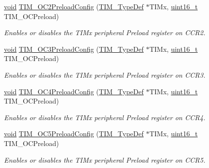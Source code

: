 \begin{DoxyCompactItemize}
\hyperlink{group___n_a_m_e_ga18028b8badbf1ea7e704ccac3c488e82}{void} \hyperlink{group___t_i_m___group2_ga75b4614c6dd2cd52f2c5becdb6590c10}{T\-I\-M\-\_\-\-O\-C2\-Preload\-Config} (\hyperlink{struct_t_i_m___type_def}{T\-I\-M\-\_\-\-Type\-Def} $\ast$T\-I\-Mx, \hyperlink{stdint_8h_a273cf69d639a59973b6019625df33e30}{uint16\-\_\-t} T\-I\-M\-\_\-\-O\-C\-Preload)
\begin{DoxyCompactList}\small\item\em Enables or disables the T\-I\-Mx peripheral Preload register on C\-C\-R2. \end{DoxyCompactList}\item 
\hyperlink{group___n_a_m_e_ga18028b8badbf1ea7e704ccac3c488e82}{void} \hyperlink{group___t_i_m___group2_ga8b2391685a519e60e596b7d596f86f09}{T\-I\-M\-\_\-\-O\-C3\-Preload\-Config} (\hyperlink{struct_t_i_m___type_def}{T\-I\-M\-\_\-\-Type\-Def} $\ast$T\-I\-Mx, \hyperlink{stdint_8h_a273cf69d639a59973b6019625df33e30}{uint16\-\_\-t} T\-I\-M\-\_\-\-O\-C\-Preload)
\begin{DoxyCompactList}\small\item\em Enables or disables the T\-I\-Mx peripheral Preload register on C\-C\-R3. \end{DoxyCompactList}\item 
\hyperlink{group___n_a_m_e_ga18028b8badbf1ea7e704ccac3c488e82}{void} \hyperlink{group___t_i_m___group2_ga8bf4dfb35ff0c7b494dd96579f50b1ec}{T\-I\-M\-\_\-\-O\-C4\-Preload\-Config} (\hyperlink{struct_t_i_m___type_def}{T\-I\-M\-\_\-\-Type\-Def} $\ast$T\-I\-Mx, \hyperlink{stdint_8h_a273cf69d639a59973b6019625df33e30}{uint16\-\_\-t} T\-I\-M\-\_\-\-O\-C\-Preload)
\begin{DoxyCompactList}\small\item\em Enables or disables the T\-I\-Mx peripheral Preload register on C\-C\-R4. \end{DoxyCompactList}\item 
\hyperlink{group___n_a_m_e_ga18028b8badbf1ea7e704ccac3c488e82}{void} \hyperlink{group___t_i_m___group2_ga09ea9adfb3eaf14ed22e0a6d5220161a}{T\-I\-M\-\_\-\-O\-C5\-Preload\-Config} (\hyperlink{struct_t_i_m___type_def}{T\-I\-M\-\_\-\-Type\-Def} $\ast$T\-I\-Mx, \hyperlink{stdint_8h_a273cf69d639a59973b6019625df33e30}{uint16\-\_\-t} T\-I\-M\-\_\-\-O\-C\-Preload)
\begin{DoxyCompactList}\small\item\em Enables or disables the T\-I\-Mx peripheral Preload register on C\-C\-R5. \end{DoxyCompactList}\item 

\end{DoxyCompactItemize}
